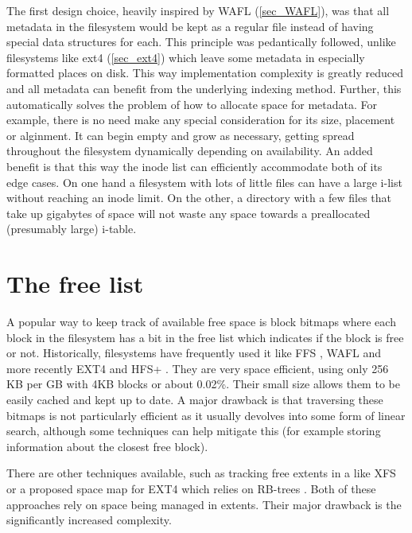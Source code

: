         The first design choice, heavily inspired by WAFL (\ref{sec_WAFL}), was
        that all metadata in the filesystem would be kept as a regular file
        instead of having special data structures for each. This principle was
        pedantically followed, unlike filesystems like ext4 (\ref{sec_ext4})
        which leave some metadata in especially formatted places on disk. This
        way implementation complexity is greatly reduced and all metadata can
        benefit from the underlying indexing method. Further, this
        automatically solves the problem of how to allocate space for metadata.
        For example, there is no need make any special consideration for its
        size, placement or alginment. It can begin empty and grow as necessary,
        getting spread throughout the filesystem dynamically depending on
        availability. An added benefit is that this way the inode list can
        efficiently accommodate both of its edge cases. On one hand a
        filesystem with lots of little files can have a large i-list without
        reaching an inode limit. On the other, a directory with a few files
        that take up gigabytes of space will not waste any space towards a
        preallocated (presumably large) i-table.

    \section{The free list}
        \label{sec_free_list}

        A popular way to keep track of available free space is block bitmaps
        where each block in the filesystem has a bit in the free list which
        indicates if the block is free or not. Historically, filesystems have
        frequently used it like FFS \cite{FFS}, WAFL \cite{WAFL} and more
        recently EXT4 \cite{ext4_space_maps} and HFS+ \cite{HFSplus}. They are
        very space efficient, using only 256 KB per GB with 4KB blocks or about
        0.02\%. Their small size allows them to be easily cached and kept up to
        date. A major drawback is that traversing these bitmaps is not
        particularly efficient as it usually devolves into some form of linear
        search, although some techniques can help mitigate this (for example
        storing information about the closest free block).

        There are other techniques available, such as tracking free extents in
        a \bplustree like XFS \cite{XFS_scalability} or a proposed space map
        for EXT4 which relies on RB-trees \cite{ext4_space_maps}. Both of these
        approaches rely on space being managed in extents. Their major drawback is
        the significantly increased complexity.


